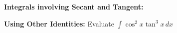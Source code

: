 \textbf{Integrals involving Secant and Tangent:}

\textbf{Using Other Identities:} Evaluate $\displaystyle\int \cos^2 x\tan^3 x\,dx$

\newpage
